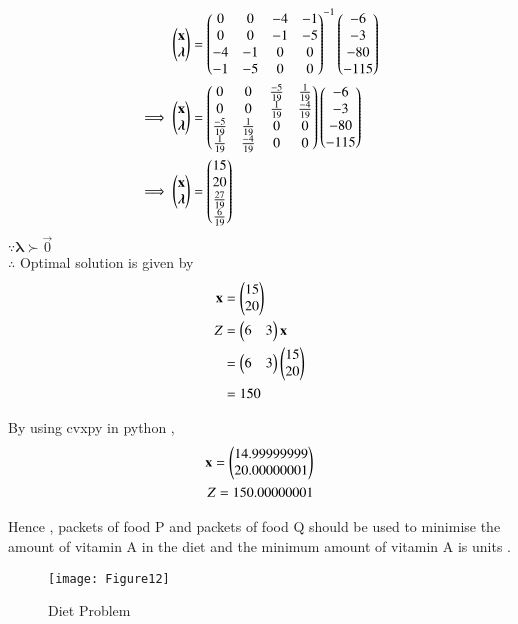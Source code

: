 \documentclass[journal,12pt,twocolumn]{IEEEtran}
\begin{document}
\begin{align}
    \begin{pmatrix}\mathbf{x} \\ \boldsymbol{\lambda}\end{pmatrix} &= \begin{pmatrix}0 & 0 & -4 & -1 \\ 0 & 0 & -1 & -5 \\ -4 & -1 & 0 & 0 \\ -1 & -5 & 0 & 0\end{pmatrix}^{-1}\begin{pmatrix}-6 \\ -3 \\ -80 \\ -115\end{pmatrix}
    \\
    \implies   \begin{pmatrix}\mathbf{x} \\ \boldsymbol{\lambda}\end{pmatrix} &= \begin{pmatrix}0 & 0 & \frac{-5}{19} & \frac{1}{19} \\ 0 & 0 & \frac{1}{19} & \frac{-4}{19} \\ \frac{-5}{19} & \frac{1}{19} & 0 & 0 \\ \frac{1}{19} & \frac{-4}{19} & 0 & 0\end{pmatrix}\begin{pmatrix}-6 \\ -3 \\ -80 \\ -115\end{pmatrix}
    \\
    \implies \begin{pmatrix}\mathbf{x} \\ \boldsymbol{\lambda}\end{pmatrix} &= \begin{pmatrix}15 \\ 20 \\ \frac{27}{19} \\ \frac{6}{19} \end{pmatrix}
\end{align}
$\because \boldsymbol{\lambda} \succ \vec{0} $
\\
$\therefore$ Optimal solution is given by
\begin{align}
    \mathbf{x} &= \begin{pmatrix}15\\20\end{pmatrix} \\
    Z &= \begin{pmatrix}6 & 3\end{pmatrix}\mathbf{x} \\
    &= \begin{pmatrix}6 & 3\end{pmatrix}\begin{pmatrix}15 \\ 20\end{pmatrix} \\
    &= 150
\end{align}

By using cvxpy in python ,
\begin{align}
    \mathbf{x}=\begin{pmatrix}14.99999999\\20.00000001\end{pmatrix}\\
    Z = 150.00000001
\end{align}

Hence , packets of food P and  packets of food Q should be used to minimise the amount of vitamin A in the diet and the minimum amount of vitamin A is  units .

\begin{figure}[!ht]
\centering
\texttt{[image: Figure12]}
\caption{Diet Problem}
\label{fig:diet problem}	
\end{figure}
\end{document}
